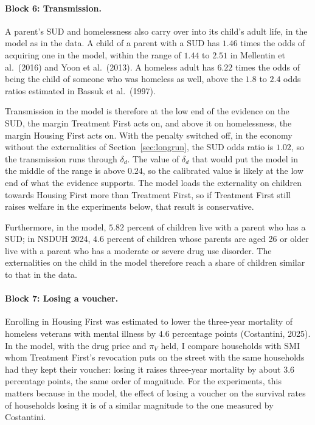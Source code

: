 \documentclass[10pt]{article}
\begin{document}
\paragraph{Block 6: Transmission.} A parent's SUD and homelessness also carry over into its child's adult life, in the model as in the data. A child of a parent with a SUD has $1.46$ times the odds of acquiring one in the model, within the range of $1.44$ to $2.51$ in Mellentin et al.\ (2016) and Yoon et al.\ (2013).  A homeless adult has $6.22$ times the odds of being the child of someone who was homeless as well, above the $1.8$ to $2.4$ odds ratios estimated in Bassuk et al.\ (1997).

Transmission in the model is therefore at the low end of the evidence on the SUD, the margin Treatment First acts on, and above it on homelessness, the margin Housing First acts on. With the penalty switched off, in the economy without the externalities of Section~\ref{sec:longrun}, the SUD odds ratio is $1.02$, so the transmission runs through $\delta_d$. The value of $\delta_d$ that would put the model in the middle of the range is above $0.24$, so the calibrated value is likely at the low end of what the evidence supports. The model loads the externality on children towards Housing First more than Treatment First, so if Treatment First still raises welfare in the experiments below, that result is conservative.

Furthermore, in the model, $5.82$ percent of children live with a parent who has a SUD; in NSDUH 2024, $4.6$ percent of children whose parents are aged 26 or older live with a parent who has a moderate or severe drug use disorder. The externalities on the child in the model therefore reach a share of children similar to that in the data.

\paragraph{Block 7: Losing a voucher.} Enrolling in Housing First was estimated to lower the three-year mortality of homeless veterans with mental illness by $4.6$ percentage points (Costantini, 2025). In the model, with the drug price and $\pi_V$ held, I compare households with SMI whom Treatment First's revocation puts on the street with the same households had they kept their voucher: losing it raises three-year mortality by about $3.6$ percentage points, the same order of magnitude.   For the experiments, this matters because in the model, the effect of losing a voucher on the survival rates of households losing it is of a similar magnitude to the one measured by Costantini.
\end{document}
